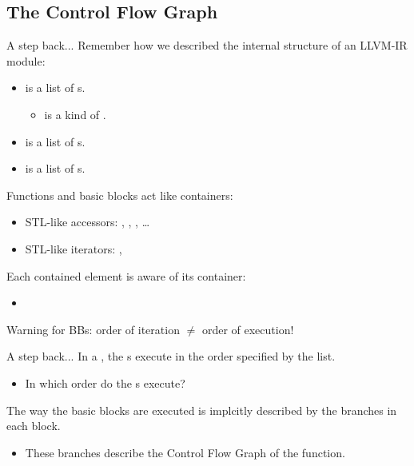 
\subsection{The Control Flow Graph}


\begin{frame}{A step back...}
Remember how we described the internal structure of an LLVM-IR module:
\begin{itemize}
\item {} is a list of s.
	\begin{itemize}
	\item {} is a kind of .
	\end{itemize}
\item {} is a list of s.
\item {} is a list of s.
\end{itemize}
\bigskip
Functions and basic blocks act like containers:

\begin{itemize}
\item STL-like accessors: , ,
      , \ldots
\item STL-like iterators: , 
\end{itemize}

\vfill
Each contained element is aware of its container:
\begin{itemize}
\item {}
\end{itemize}
\vfill
Warning for BBs: order of iteration $\neq$ order of execution!
\end{frame}


\begin{frame}{A step back...}
In a , the s execute
in the order specified by the list.\\
\begin{itemize}
\item In which order do the s execute?
\end{itemize}
\bigskip
The way the basic blocks are executed is implcitly described by
the \alert{branches} in each block.\\
\begin{itemize}
\item These branches describe the \alert{Control Flow Graph} of the function.
\end{itemize}
\end{frame}


